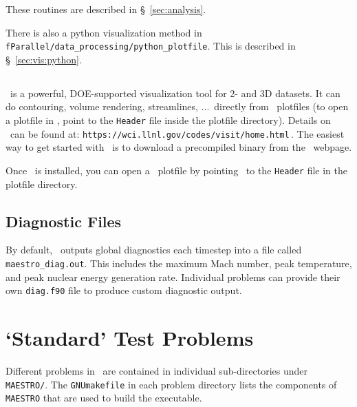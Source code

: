 These routines are described in \S~\ref{sec:analysis}.

There is also a python visualization method in {\tt
fParallel/data\_processing/python\_plotfile}.  This is described
in \S~\ref{sec:vis:python}.


\subsection{\visit}

\visit\ is a powerful, DOE-supported visualization tool for 2- and 3D
datasets.  It can do contouring, volume rendering, streamlines, ...\
directly from \boxlib\ plotfiles (to open a plotfile in \visit, point to
the {\tt Header} file inside the plotfile directory).  Details on
\visit\ can be found at:\newline
 {\tt https://wci.llnl.gov/codes/visit/home.html}\,. \newline
The easiest way to get started with \visit\ is to download a precompiled
binary from the \visit\ webpage.

Once \visit\ is installed, you can open a \boxlib\ plotfile by pointing
\visit\ to the {\tt Header} file in the plotfile directory.

\subsection{Diagnostic Files}

By default, \maestro\ outputs global diagnostics each timestep into a file
called {\tt maestro\_diag.out}.  This includes the maximum Mach number,
peak temperature, and peak nuclear energy generation rate.  Individual problems
can provide their own {\tt diag.f90} file to produce custom diagnostic
output.





\section{`Standard' Test Problems}

Different problems in \maestro\ are contained in individual
sub-directories under {\tt MAESTRO/}.  The {\tt GNUmakefile}
in each problem directory lists the components of {\tt MAESTRO}
that are used to build the executable.  

